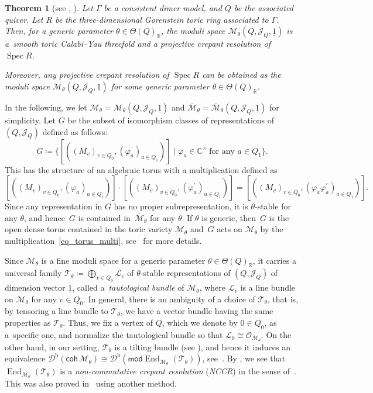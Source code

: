 \documentclass[pdftex]{sigma}
\numberwithin{equation}{section}
\newtheorem{Theorem}{Theorem}[section]
\theoremstyle{definition}
\newcommand{\RR}{\mathbb{R}}
\newcommand{\CC}{\mathbb{C}}
\newcommand{\calD}{\mathcal{D}}
\newcommand{\calJ}{\mathcal{J}}
\newcommand{\calL}{\mathcal{L}}
\newcommand{\calM}{\mathcal{M}}
\newcommand{\calO}{\mathcal{O}}
\newcommand{\calT}{\mathcal{T}}
\newcommand{\Spec}{\operatorname{Spec}}
\newcommand{\End}{\operatorname{End}}
\newcommand{\barone}{\underline{1}}
\begin{document}
\begin{Theorem}[{see \cite[Theorems~6.3 and 6.4]{IU_moduli}, \cite[Corollary~1.2]{IU_anycrepant}}]
\label{thm_crepant_dimer}
Let $\Gamma$ be a consistent dimer model, and $Q$ be the associated quiver.
Let $R$ be the three-dimensional Gorenstein toric ring associated to $\Gamma$.
Then, for a generic parameter $\theta\in\Theta(Q)_\RR$, the moduli space $\calM_\theta(Q,\calJ_Q, \barone)$ is a~smooth toric Calabi--Yau threefold
and a projective crepant resolution of $\Spec R$.

Moreover, any projective crepant resolution of $\Spec R$ can be obtained as the moduli space $\calM_\theta(Q,\calJ_Q, \barone)$ for some generic parameter $\theta\in\Theta(Q)_\RR$.
\end{Theorem}

In the following, we let $\calM_\theta=\calM_\theta(Q,\calJ_Q, \barone)$ and $\overline{\calM}_\theta=\overline{\calM}_\theta(Q,\calJ_Q, \barone)$ for simplicity.
Let $G$ be the subset of isomorphism classes of representations of $(Q,\calJ_Q)$ defined as follows:
\[
G\coloneqq \bigl\{ [((M_v)_{v\in Q_0}, (\varphi_a)_{a\in Q_1}) ] \mid \varphi_a\in \CC^\times \ \text{for any $a\in Q_1$} \bigr\}.
\]
This has the structure of an algebraic torus with a multiplication defined as
\begin{equation}
\label{eq_torus_multi}
 [((M_v)_{v\in Q_0}, (\varphi_a)_{a\in Q_1}) ]\cdot [((M_v)_{v\in Q_0}, (\varphi^\prime_a)_{a\in Q_1}) ]
= [((M_v)_{v\in Q_0}, (\varphi_a\varphi^\prime_a)_{a\in Q_1}) ].
\end{equation}
Since any representation in $G$ has no proper subrepresentation, it is $\theta$-stable for any $\theta$,
and hence~$G$ is contained in~$\overline{\calM}_\theta$ for any $\theta$.
If $\theta$ is generic, then~$G$ is the open dense torus contained in the toric variety $\calM_\theta$
and~$G$ acts on $\calM_\theta$ by the multiplication~\eqref{eq_torus_multi}, see~\cite{IU_moduli} for more details.

Since $\calM_\theta$ is a fine moduli space for a generic parameter $\theta\in\Theta(Q)_\RR$,
it carries a universal family $\calT_\theta\coloneqq \bigoplus_{v\in Q_0}\calL_v$
of $\theta$-stable representations of $(Q,\calJ_Q)$ of dimension vector $\barone$, called a~\emph{tautological bundle} of $\calM_\theta$,
where $\calL_v$ is a line bundle on $\calM_\theta$ for any $v\in Q_0$.
In general, there is an ambiguity of a choice of $\calT_\theta$, that is, by tensoring a line bundle to $\calT_\theta$,
we have a vector bundle having the same properties as $\calT_\theta$.
Thus, we fix a vertex of $Q$, which we denote by $0\in Q_0$, as a~specific one, and normalize the tautological bundle so that $\calL_0\cong\calO_{\calM_\theta}$.
On the other hand, in our setting, $\calT_\theta$ is a tilting bundle (see \cite[Theorem~1.4]{IU_special}), and hence it induces an equivalence $\calD^\mathrm{b}(\mathsf{coh}\,\calM_\theta)\cong\calD^\mathrm{b}(\mathsf{mod} \End_{\calM_\theta}(\calT_\theta))$, see~\cite{Bondal_SEC,Rickard_morita}.
By \cite[Corollary~4.15]{IW_singular}, we see that $\End_{\calM_\theta}(\calT_\theta)$
is a \emph{non-commutative crepant resolution} (\emph{NCCR}) in the sense of~\cite{VdB_NCCR}.
This was also proved in~\cite{Bro_dimer} using another method.
\end{document}
